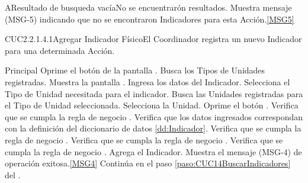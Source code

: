 	\begin{UCtrayectoriaA}{A}{Resultado de busqueda vacía}{No se encuentrarón resultados.}
		\UCpaso Muestra mensaje (MSG-5) indicando que no se encontraron Indicadores para esta Acción.\ref{MSG5}
	\end{UCtrayectoriaA}

	\begin{UseCase}{CUC2.2.1.4.1}{Agregar Indicador Físico}{El Coordinador registra un nuevo Indicador para una determinada Acción.}
	\end{UseCase}

	\begin{UCtrayectoria}{Principal}
			\UCpaso[\UCactor] Oprime el botón  de la pantalla .
			\UCpaso Busca los Tipos de Unidades registradas.
			\UCpaso Muestra la pantalla .
			\UCpaso [\UCactor] Ingresa los datos del Indicador.\label{paso:CUC1.4.1ingresaDatosIndicador}
			\UCpaso [\UCactor] Selecciona el Tipo de Unidad necesitada para el indicador.
			\UCpaso Busca las Unidades registradas para el Tipo de Unidad seleccionada.\label{paso:CUC141buscaUnidades}
			\UCpaso [\UCactor] Selecciona la Unidad.
			\UCpaso [\UCactor] Oprime el botón .\label{paso:CUCagregarIndicador}
			\UCpaso Verifica que se cumpla la regla de negocio . 
			\UCpaso Verifica que los datos ingresados correspondan  con la definición del diccionario de datos \ref{dd:Indicador}. 
			\UCpaso Verifica que se cumpla la regla de negocio .
			\UCpaso Verifica que se cumpla la regla de negocio .
			\UCpaso Verifica que se cumpla la regla de negocio .
			\UCpaso Agrega el Indicador.
			\UCpaso Muestra el mensaje (MSG-4) de operación exitosa.\ref{MSG4}
			\UCpaso Continúa en el paso \ref{paso:CUC14BuscarIndicadores} del .
	\end{UCtrayectoria}

